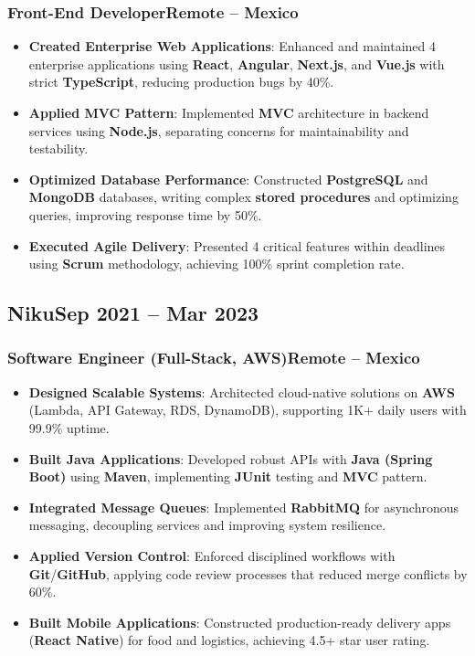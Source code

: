 \documentclass[a4paper,10pt]{article}
\newcommand{\kw}[1]{\textbf{\textcolor{keyword}{#1}}}
\newcommand{\tech}[1]{\textbf{\textcolor{tech}{#1}}}
\begin{document}
\subsubsection*{\small Front-End Developer\hfill Remote -- Mexico}
\begin{itemize}[noitemsep, leftmargin=*]
    \item \textbf{Created Enterprise Web Applications}: Enhanced and maintained 4 enterprise applications using \tech{React}, \tech{Angular}, \tech{Next.js}, and \tech{Vue.js} with strict \tech{TypeScript}, reducing production bugs by 40\%.
    \item \textbf{Applied MVC Pattern}: Implemented \kw{MVC} architecture in backend services using \tech{Node.js}, separating concerns for maintainability and testability.
    \item \textbf{Optimized Database Performance}: Constructed \kw{PostgreSQL} and \kw{MongoDB} databases, writing complex \kw{stored procedures} and optimizing queries, improving response time by 50\%.
    \item \textbf{Executed Agile Delivery}: Presented 4 critical features within deadlines using \kw{Scrum} methodology, achieving 100\% sprint completion rate.
\end{itemize}

\subsection*{\small Niku\hfill\textbf{Sep 2021 -- Mar 2023}}
\subsubsection*{\small Software Engineer (Full-Stack, AWS)\hfill Remote -- Mexico}
\begin{itemize}[noitemsep, leftmargin=*]
    \item \textbf{Designed Scalable Systems}: Architected cloud-native solutions on \tech{AWS} (Lambda, API Gateway, RDS, DynamoDB), supporting 1K+ daily users with 99.9\% uptime.
    \item \textbf{Built Java Applications}: Developed robust APIs with \tech{Java (Spring Boot)} using \tech{Maven}, implementing \tech{JUnit} testing and \tech{MVC} pattern.
    \item \textbf{Integrated Message Queues}: Implemented \tech{RabbitMQ} for asynchronous messaging, decoupling services and improving system resilience.
    \item \textbf{Applied Version Control}: Enforced disciplined workflows with \tech{Git}/\tech{GitHub}, applying code review processes that reduced merge conflicts by 60\%.
    \item \textbf{Built Mobile Applications}: Constructed production-ready delivery apps (\tech{React Native}) for food and logistics, achieving 4.5+ star user rating.
\end{itemize}
\end{document}
